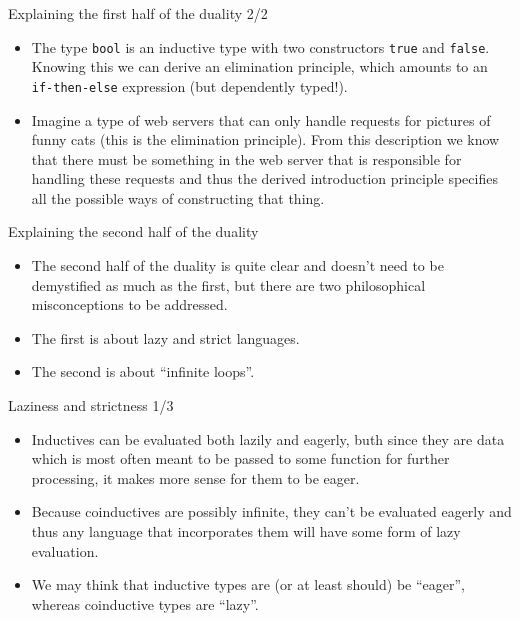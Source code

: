 \documentclass{beamer}
\begin{document}
\begin{frame}{Explaining the first half of the duality 2/2}
\begin{itemize}
	\item The type \texttt{bool} is an inductive type with two constructors \texttt{true} and \texttt{false}. Knowing this we can derive an elimination principle, which amounts to an \texttt{if-then-else} expression (but dependently typed!).
	\item Imagine a type of web servers that can only handle requests for pictures of funny cats (this is the elimination principle). From this description we know that there must be something in the web server that is responsible for handling these requests and thus the derived introduction principle specifies all the possible ways of constructing that thing.
\end{itemize}
\end{frame}

\begin{frame}{Explaining the second half of the duality}
\begin{itemize}
	\item The second half of the duality is quite clear and doesn't need to be demystified as much as the first, but there are two philosophical misconceptions to be addressed.
	\item The first is about lazy and strict languages.
	\item The second is about ``infinite loops''.
\end{itemize}
\end{frame}

\begin{frame}{Laziness and strictness 1/3}
\begin{itemize}
	\item Inductives can be evaluated both lazily and eagerly, buth since they are data which is most often meant to be passed to some function for further processing, it makes more sense for them to be eager.
	\item Because coinductives are possibly infinite, they can't be evaluated eagerly and thus any language that incorporates them will have some form of lazy evaluation.
	\item We may think that inductive types are (or at least should) be ``eager'', whereas coinductive types are ``lazy''.
\end{itemize}
\end{frame}
\end{document}
